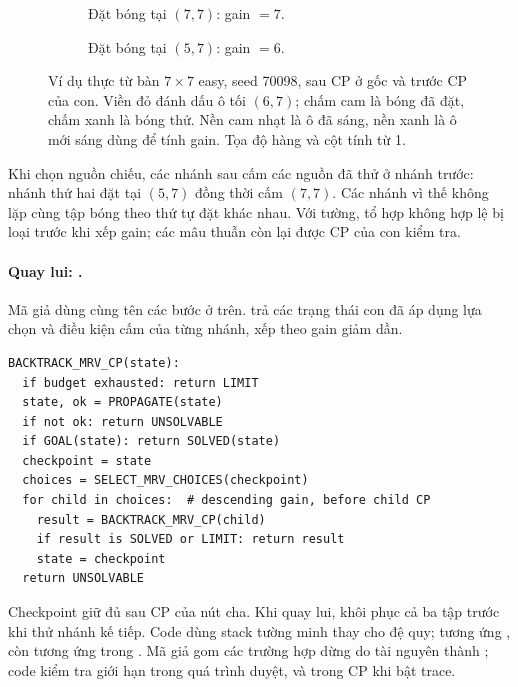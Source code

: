 \begin{figure}[H]
\centering
\begingroup
{}
\begin{subfigure}[t]{.46\textwidth}
\centering
\scalebox{1.55}{}
\caption{Đặt bóng tại $(7,7)$: gain $=7$.}
\end{subfigure}\hfill
\begin{subfigure}[t]{.46\textwidth}
\centering
\scalebox{1.55}{}
\caption{Đặt bóng tại $(5,7)$: gain $=6$.}
\end{subfigure}
\endgroup
\caption{Ví dụ thực từ bàn $7\times7$ easy, seed 70098, sau CP ở gốc và trước
CP của con. Viền đỏ đánh dấu ô tối $(6,7)$; chấm cam là bóng đã đặt, chấm xanh
là bóng thử. Nền cam nhạt là ô đã sáng, nền xanh là ô mới sáng dùng để tính gain.
Tọa độ hàng và cột tính từ 1.}
\label{fig:lightup-gain-70098}
\end{figure}

Khi chọn nguồn chiếu, các nhánh sau cấm các nguồn đã thử ở nhánh trước:
nhánh thứ hai đặt tại $(5,7)$ đồng thời cấm $(7,7)$. Các nhánh vì thế không
lặp cùng tập bóng theo thứ tự đặt khác nhau. Với tường, tổ hợp không hợp lệ
bị loại trước khi xếp gain; các mâu thuẫn còn lại được CP của con kiểm tra.

\paragraph{Quay lui: .} Mã giả dùng cùng tên các
bước ở trên.  trả các trạng thái con đã áp dụng
lựa chọn và điều kiện cấm của từng nhánh, xếp theo gain giảm dần.

\noindent\begin{minipage}{\textwidth}
\begin{lstlisting}
BACKTRACK_MRV_CP(state):
  if budget exhausted: return LIMIT
  state, ok = PROPAGATE(state)
  if not ok: return UNSOLVABLE
  if GOAL(state): return SOLVED(state)
  checkpoint = state
  choices = SELECT_MRV_CHOICES(checkpoint)
  for child in choices:  # descending gain, before child CP
    result = BACKTRACK_MRV_CP(child)
    if result is SOLVED or LIMIT: return result
    state = checkpoint
  return UNSOLVABLE
\end{lstlisting}
\end{minipage}

Checkpoint giữ đủ  sau CP của nút cha. Khi quay lui,
khôi phục cả ba tập trước khi thử nhánh kế tiếp. Code dùng stack tường minh
thay cho đệ quy;  tương ứng , còn
 tương ứng  trong
. Mã giả gom các trường hợp dừng do tài nguyên
thành ; code kiểm tra giới hạn trong quá trình duyệt, và trong
CP khi bật trace.

